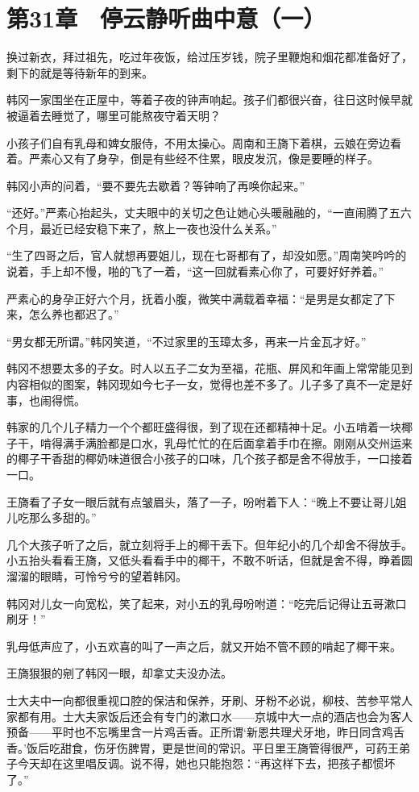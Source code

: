 \section{第31章　停云静听曲中意（一）}

换过新衣，拜过祖先，吃过年夜饭，给过压岁钱，院子里鞭炮和烟花都准备好了，剩下的就是等待新年的到来。

韩冈一家围坐在正屋中，等着子夜的钟声响起。孩子们都很兴奋，往日这时候早就被逼着去睡觉了，哪里可能熬夜守着天明？

小孩子们自有乳母和婢女服侍，不用太操心。周南和王旖下着棋，云娘在旁边看着。严素心又有了身孕，倒是有些经不住累，眼皮发沉，像是要睡的样子。

韩冈小声的问着，“要不要先去歇着？等钟响了再唤你起来。”

“还好。”严素心抬起头，丈夫眼中的关切之色让她心头暖融融的，“一直闹腾了五六个月，最近已经安稳下来了，熬上一夜也没什么关系。”

“生了四哥之后，官人就想再要姐儿，现在七哥都有了，却没如愿。”周南笑吟吟的说着，手上却不慢，啪的飞了一着，“这一回就看素心你了，可要好好养着。”

严素心的身孕正好六个月，抚着小腹，微笑中满载着幸福：“是男是女都定了下来，怎么养也都迟了。”

“男女都无所谓。”韩冈笑道，“不过家里的玉璋太多，再来一片金瓦才好。”

韩冈不想要太多的子女。时人以五子二女为至福，花瓶、屏风和年画上常常能见到内容相似的图案，韩冈现如今七子一女，觉得也差不多了。儿子多了真不一定是好事，也闹得慌。

韩家的几个儿子精力一个个都旺盛得很，到了现在还都精神十足。小五啃着一块椰子干，啃得满手满脸都是口水，乳母忙忙的在后面拿着手巾在擦。刚刚从交州运来的椰子干香甜的椰奶味道很合小孩子的口味，几个孩子都是舍不得放手，一口接着一口。

王旖看了子女一眼后就有点皱眉头，落了一子，吩咐着下人：“晚上不要让哥儿姐儿吃那么多甜的。”

几个大孩子听了之后，就立刻将手上的椰干丢下。但年纪小的几个却舍不得放手。小五抬头看看王旖，又低头看看手中的椰干，不敢不听话，但就是舍不得，睁着圆溜溜的眼睛，可怜兮兮的望着韩冈。

韩冈对儿女一向宽松，笑了起来，对小五的乳母吩咐道：“吃完后记得让五哥漱口刷牙！”

乳母低声应了，小五欢喜的叫了一声之后，就又开始不管不顾的啃起了椰干来。

王旖狠狠的剜了韩冈一眼，却拿丈夫没办法。

士大夫中一向都很重视口腔的保洁和保养，牙刷、牙粉不必说，柳枝、苦参平常人家都有用。士大夫家饭后还会有专门的漱口水——京城中大一点的酒店也会为客人预备——平时也不忘嘴里含一片鸡舌香。正所谓‘新恩共理犬牙地，昨日同含鸡舌香。’饭后吃甜食，伤牙伤脾胃，更是世间的常识。平日里王旖管得很严，可药王弟子今天却在这里唱反调。说不得，她也只能抱怨：“再这样下去，把孩子都惯坏了。”

